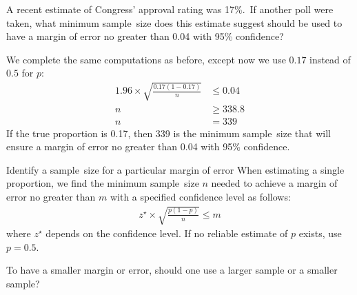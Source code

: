 \begin{examplewrap}
\begin{nexample}
{A recent estimate of Congress' approval rating was 17\%.\footnotemark\, If another poll were taken, what minimum sample~size does this estimate suggest should be used to have a margin of error no greater than 0.04 with 95\% confidence?}

We complete the same computations as before, except now we use $0.17$ instead of $0.5$ for $p$:
\begin{align*}
1.96\times \sqrt{\frac{0.17(1-0.17)}{n}} &\leq 0.04\\
n &\geq 338.8\\
n &= 339
\end{align*}
If the true proportion is 0.17, then 339 is the minimum sample~size that will ensure a margin of error no greater than 0.04 with 95\% confidence.


\end{nexample}
\end{examplewrap}

\begin{onebox}{Identify a sample~size for a particular margin of error}
When estimating a single proportion, we find the minimum sample~size $n$ needed to achieve a margin of error no greater than $m$ with a specified confidence level as follows:
\begin{align*}
z^{\star}\times \sqrt{\frac{p(1-p)}{n}} \leq m
\end{align*}
where $z^{\star}$ depends on the confidence level.   If no reliable estimate of $p$ exists, use $p = 0.5$.  	
\end{onebox}

\begin{exercisewrap}
\begin{nexercise}To have a smaller margin or error, should one use a larger sample or a smaller sample?\footnotemark
\end{nexercise}
\end{exercisewrap}

